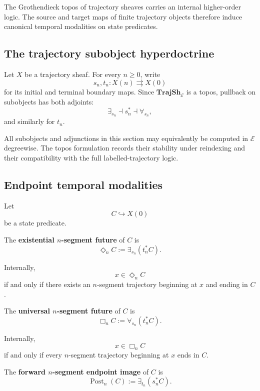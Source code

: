 The Grothendieck topos of trajectory sheaves carries an internal
higher-order logic. The source and target maps of finite trajectory objects
therefore induce canonical temporal modalities on state predicates.

\subsection{The trajectory subobject hyperdoctrine}
\label{subsec:trajectory-subobject-hyperdoctrine}

Let \(X\) be a trajectory sheaf. For every \(n\geq0\), write
\[
    s_n,t_n:X(n)\rightrightarrows X(0)
\]
for its initial and terminal boundary maps. Since
\(\mathbf{TrajSh}_{\mathcal E}\) is a topos, pullback on subobjects has both
adjoints:
\[
    \exists_{s_n}
    \dashv
    s_n^\ast
    \dashv
    \forall_{s_n},
\]
and similarly for \(t_n\).

All subobjects and adjunctions in this section may equivalently be computed
in \(\mathcal E\) degreewise. The topos formulation records their stability
under reindexing and their compatibility with the full labelled-trajectory
logic.

\subsection{Endpoint temporal modalities}
\label{subsec:endpoint-temporal-modalities}

Let
\[
    C\hookrightarrow X(0)
\]
be a state predicate.

\begin{definition}
\label{def:existential-future}
The \textbf{existential \(n\)-segment future} of \(C\) is
\[
    \Diamond_n C
    :=
    \exists_{s_n}(t_n^\ast C).
\]
\end{definition}

Internally,
\[
    x\in\Diamond_nC
\]
if and only if there exists an \(n\)-segment trajectory beginning at \(x\)
and ending in \(C\).

\begin{definition}
\label{def:universal-future}
The \textbf{universal \(n\)-segment future} of \(C\) is
\[
    \Box_n C
    :=
    \forall_{s_n}(t_n^\ast C).
\]
\end{definition}

Internally,
\[
    x\in\Box_nC
\]
if and only if every \(n\)-segment trajectory beginning at \(x\) ends in
\(C\).

\begin{definition}
\label{def:forward-endpoint-image}
The \textbf{forward \(n\)-segment endpoint image} of \(C\) is
\[
    \operatorname{Post}_n(C)
    :=
    \exists_{t_n}(s_n^\ast C).
\]
\end{definition}

